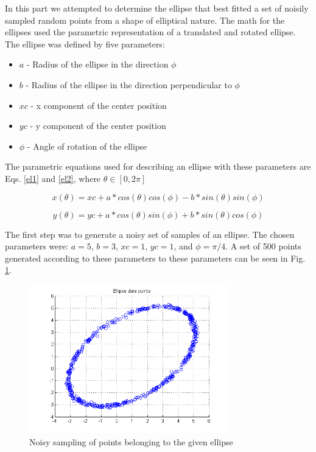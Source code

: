 \documentclass[journal]{IEEEtran}
\begin{document}
In this part we attempted to determine the ellipse that best fitted a set of noisily sampled random points from a shape of elliptical nature. The math for the ellipses used the parametric representation of a translated and rotated ellipse. The ellipse was defined by five parameters:

\begin{itemize}
    \item $a$ - Radius of the ellipse in the direction $\phi$
    \item $b$ - Radius of the ellipse in the direction perpendicular to $\phi$
    \item $xc$ - x component of the center position
    \item $yc$ - y component of the center position
    \item $\phi$ - Angle of rotation of the ellipse
\end{itemize}

The parametric equations used for describing an ellipse with these parameters are Eqs. \ref{el1} and \ref{el2}, where $\theta \in [0,2\pi]$

\begin{equation}
x(\theta) = xc + a*cos(\theta)cos(\phi) - b*sin(\theta)sin(\phi)
\label{el1}
\end{equation}

\begin{equation}
y(\theta) = yc + a*cos(\theta)sin(\phi) + b*sin(\theta)cos(\phi)
\label{el2}
\end{equation}

The first step was to generate a noisy set of samples of an ellipse. The chosen parameters were: $a=5$, $b=3$, $xc = 1$, $yc = 1$, and $\phi = \pi /4$. A set of 500 points generated according to these parameters to these parameters can be seen in Fig. \ref{figGT}.


\begin{figure}[H]
\centering
\includegraphics[width=3.4in]{figures/nd-groundTruth.png}
\caption{Noisy sampling of points belonging to the given ellipse}
\label{figGT}
\end{figure}
\end{document}
